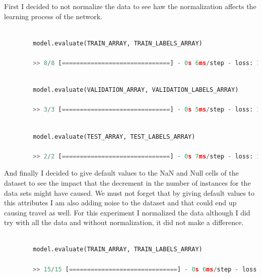 \documentclass[12pt, a4paper]{article}
\begin{document}
	First I decided to not normalize the data to see haw the normalization affects the learning process of the network.
	
	\vspace{5mm}
	\begin{lstlisting}[language=Python]
		
		model.evaluate(TRAIN_ARRAY, TRAIN_LABELS_ARRAY)
		
		>> 8/8 [==============================] - 0s 6ms/step - loss: 1.0161 - categorical_accuracy: 0.4790 - accuracy: 0.0000e+00
	\end{lstlisting}
	
	\vspace{7mm}
	
	\begin{lstlisting}[language=Python]
		
		model.evaluate(VALIDATION_ARRAY, VALIDATION_LABELS_ARRAY)
		
		>> 3/3 [==============================] - 0s 5ms/step - loss: 1.0381 - categorical_accuracy: 0.4459 - accuracy: 0.0034
	\end{lstlisting}
	
	\vspace{7mm}
	
	\begin{lstlisting}[language=Python]
		
		model.evaluate(TEST_ARRAY, TEST_LABELS_ARRAY)
		
		>> 2/2 [==============================] - 0s 7ms/step - loss: 1.1821 - categorical_accuracy: 0.3390 - accuracy: 0.0000e+00
	\end{lstlisting}
	
	\vspace{5mm}
	
	And finally I decided to give default values to the NaN and Null cells of the dataset to see the impact that the decrement in the number of instances for the data sets might have caused. We must not forget that by giving default values to this attributes I am also adding noise to the dataset and that could end up causing travel as well. For this experiment I normalized the data although I did try with all the data and without normalization, it did not make a difference.
	
	\clearpage
	\begin{lstlisting}[language=Python]
		
		model.evaluate(TRAIN_ARRAY, TRAIN_LABELS_ARRAY)
		
		>> 15/15 [==============================] - 0s 6ms/step - loss: 0.8312 - categorical_accuracy: 0.6717 - accuracy: 0.0000e+00
	\end{lstlisting}
	
\end{document}
